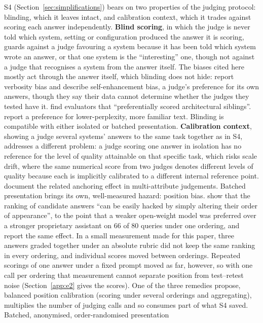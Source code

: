 \documentclass[11pt]{article}
\begin{document}
S4 (Section~\ref{sec:simplifications}) bears on two properties of the judging protocol: blinding, which it leaves intact, and calibration context, which it trades against scoring each answer independently. \textbf{Blind scoring}, in which the judge is never told which system, setting or configuration produced the answer it is scoring, guards against a judge favouring a system because it has been told which system wrote an answer, or that one system is the ``interesting'' one, though not against a judge that recognises a system from the answer itself. The biases cited here mostly act through the answer itself, which blinding does not hide:
\citet{zheng2023judging} report verbosity bias and describe self-enhancement bias, a judge's preference for its own answers, though they say their data cannot determine whether the judges they tested have it. \citet{philipp2026clinical} find evaluators that ``preferentially scored architectural siblings''.
\citet{stureborg2024inconsistent} report a preference for lower-perplexity, more familiar
text. Blinding is compatible with either isolated or batched presentation.
\textbf{Calibration context}, showing a judge several systems' answers to the same task together as in S4, addresses a different problem: a judge scoring one answer in
isolation has no reference for the level of quality attainable on that specific task, which risks
scale drift, where the same numerical score from two judges denotes different levels of
quality because each is implicitly calibrated to a different internal reference point.
\citet{stureborg2024inconsistent} document the related anchoring effect in multi-attribute
judgements. Batched presentation brings its own, well-measured hazard: position bias.
\citet{wang2023unfair} show that the ranking of candidate answers ``can be easily hacked by
simply altering their order of appearance'', to the point that a weaker open-weight model
was preferred over a stronger proprietary assistant on 66 of 80 queries under one
ordering, and \citet{zheng2023judging} report
the same effect. In a small measurement made for this paper, three answers graded
together under an absolute rubric did not keep the same ranking in every ordering, and individual scores moved between orderings. Repeated scorings of one answer under a fixed prompt moved as far, however, so with one call per ordering that measurement cannot separate position from test--retest noise (Section~\ref{app:e2} gives the scores). One of the three remedies \citet{wang2023unfair} propose, balanced position calibration (scoring under several orderings and aggregating), multiplies the number of judging calls and so consumes part of what S4 saved. Batched, anonymised, order-randomised presentation
\end{document}

